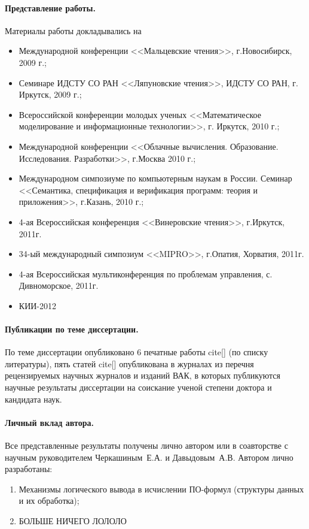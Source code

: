 \paragraph{Представление работы.} Материалы работы докладывались на
\begin{itemize}
\item Международной конференции <<Мальцевские чтения>>, г.Новосибирск, 2009 г.;
\item Семинаре ИДСТУ СО РАН <<Ляпуновские чтения>>, ИДСТУ СО РАН, г. Иркутск, 2009 г.;
\item Всероссийской конференции молодых ученых <<Математическое моделирование и информационные технологии>>, г. Иркутск, 2010 г.;
\item Международной конференции <<Облачные вычисления. Образование. Исследования. Разработки>>, г.Москва 2010 г.;
\item Международном симпозиуме по компьютерным наукам в России. Семинар <<Семантика, спецификация и верификация программ: теория и приложения>>, г.Казань, 2010 г.;
\item 4-ая Всероссийская конференция <<Винеровские чтения>>, г.Иркутск, 2011г.
\item 34-ый международный симпозиум <<MIPRO>>, г.Опатия, Хорватия, 2011г.
\item 4-ая Всероссийская мультиконференция по проблемам управления, с. Дивноморское, 2011г.
\item КИИ-2012
\end{itemize}

\paragraph{Публикации по теме диссертации.} По теме диссертации опубликовано 6 печатные работы cite[] (по списку литературы), пять статей cite[] опубликована в журналах из перечня рецензируемых научных журналов и изданий ВАК, в которых публикуются научные результаты диссертации на соискание ученой степени доктора и кандидата наук.

\paragraph{Личный вклад автора.} Все представленные результаты получены лично автором или в соавторстве с научным руководителем Черкашиным~Е.А. и Давыдовым~А.В. Автором лично разработаны:
\begin{enumerate}
\item Механизмы логического вывода в исчислении ПО-формул (структуры данных и их обработка);
\item БОЛЬШЕ НИЧЕГО ЛОЛОЛО
\end{enumerate}

